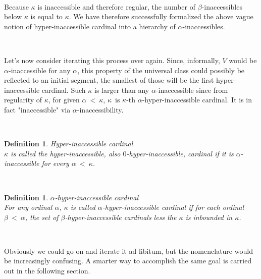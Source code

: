 \documentclass[12pt,a4paper]{article}
\newtheorem{definition}[theorem]{Definition}
\begin{document}
\

Because $\kappa$ is inaccessible and therefore regular, the number of $\beta$-inaccessibles below $\kappa$ is equal to $\kappa$. We have therefore successfully formalized the above vague notion of hyper-inaccessible cardinal into a hierarchy of $\alpha$-inaccessibles.

\

Let's now consider iterating this process over again. Since, informally, $V$ would be $\alpha$-inaccessible for any $\alpha$, this property of the universal class could possibly be reflected to an initial segment, the smallest of those will be the first hyper-inaccessible cardinal. Such $\kappa$ is larger than any $\alpha$-inaccessible since from regularity of $\kappa$, for given $\alpha\ <\ \kappa$, $\kappa$ is $\kappa$-th $\alpha$-hyper-inaccessible cardinal. It is in fact "inaccessible" via $\alpha$-inaccessibility.

\

\begin{definition}{Hyper-inaccessible cardinal}\\
$\kappa$ is called the hyper-inaccessible, also $0$-hyper-inaccessible, cardinal if it is $\alpha$-inaccessible for every $\alpha\ <\ \kappa$.
\end{definition}

\

\begin{definition}{$\alpha$-hyper-inaccessible cardinal}\\
For any ordinal $\alpha$, $\kappa$ is called $\alpha$-hyper-inaccessible cardinal if for each ordinal $\beta\ <\ \alpha$, the set of $\beta$-hyper-inaccessible cardinals less the $\kappa$ is inbounded in $\kappa$.
\end{definition}

\

Obviously we could go on and iterate it ad libitum, but the nomenclature would be increasingly confusing. A smarter way to accomplish the same goal is carried out in the following section.

\end{document}
